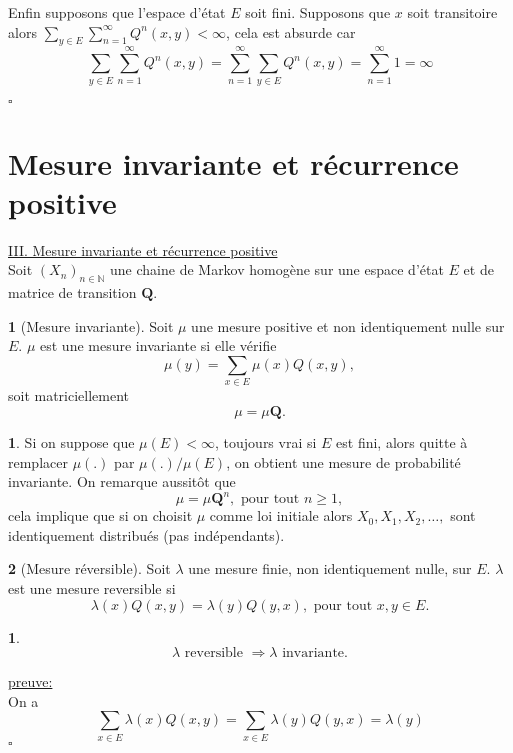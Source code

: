 \documentclass[8pt,notheorems]{beamer}
\def \N{\mathbb N}
\newtheorem{prop}{\translate{Proposition}}
\theoremstyle{definition}
\newtheorem{definition}{\translate{Definition}}
\theoremstyle{example}
\newtheorem{remark}{\translate{Remarque}}
\theoremstyle{mystyle}
\theoremstyle{plain}
\begin{document}
\begin{frame}[allowframebreaks]
Enfin supposons que l'espace d'état $E$ soit fini. Supposons que $x$ soit transitoire alors $\sum_{y\in E} \sum_{n= 1}^{\infty} Q^{n}(x,y) <\infty$, cela est absurde car
$$
\sum_{y\in E} \sum_{n= 1}^{\infty} Q^{n}(x,y) = \sum_{n= 1}^{\infty} \sum_{y\in E}  Q^{n}(x,y) = \sum_{n = 1}^{\infty} 1 =\infty
$$

$\square$
\end{frame}


\section{Mesure invariante et récurrence positive}
\begin{frame}[allowframebreaks]
\underline{III. Mesure invariante et récurrence positive}\\
Soit $(X_n)_{n\in \N}$ une chaine de Markov homogène sur une espace d'état $E$ et de matrice de transition $\mathbf{Q}$.
\begin{definition}[Mesure invariante]
Soit $\mu$ une mesure positive et non identiquement nulle sur $E$. $\mu$ est une mesure invariante si elle vérifie
$$
\mu(y) = \sum_{x\in E}\mu(x)Q(x,y),
$$
soit matriciellement $$\mu = \mu \mathbf{Q}.$$
\end{definition}
\begin{remark}
Si on suppose que $\mu(E)<\infty$, toujours vrai si $E$ est fini, alors quitte à remplacer $\mu(.)$ par $\mu(.)/\mu(E)$, on obtient une mesure de probabilité invariante. On remarque aussitôt que
$$
\mu = \mu\mathbf{Q}^{n},\text{ pour tout }n\geq1,
$$
cela implique que si on choisit $\mu$ comme loi initiale alors $X_0, X_1, X_2,\ldots,$ sont identiquement distribués (pas indépendants).
\end{remark}
\end{frame}
\begin{frame}[allowframebreaks]
\begin{definition}[Mesure réversible]
Soit $\lambda$ une mesure finie, non identiquement nulle, sur $E$. $\lambda$ est une mesure reversible si
$$
\lambda(x)Q(x,y) = \lambda(y)Q(y,x),\text{ pour tout }x,y\in E.
$$
\end{definition}
\begin{prop}
$$
\lambda \text{ reversible }\Rightarrow  \lambda \text{ invariante.}
$$
\end{prop}
\underline{preuve:}\\
On a
$$
\sum_{x\in E}\lambda(x)Q(x,y)=\sum_{x\in E}\lambda(y)Q(y,x) =\lambda(y)
$$
$\square$\\
\end{frame}
\end{document}

